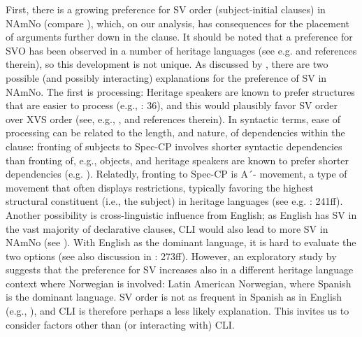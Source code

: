 \documentclass[output=paper]{langscibook}
\begin{document}
First, there is a growing preference for SV order (subject-initial clauses) in NAmNo (compare ), which, on our analysis, has consequences for the placement of arguments further down in the clause. It should be noted that a preference for SVO has been observed in a number of heritage languages (see e.g. \citealt{Laleko2021} and references therein), so this development is not unique. As discussed by \citet{LarssonForthcoming}, there are two possible (and possibly interacting) explanations for the preference of SV in NAmNo. The first is processing: Heritage speakers are known to prefer structures that are easier to process (e.g., \citealt{Polinsky2018}: 36), and this would plausibly favor SV order over XVS order (see, e.g., \citealt{BickelEtAl2015, Hörberg2016}, and references therein). In syntactic terms, ease of processing can be related to the length, and nature, of dependencies within the clause: fronting of subjects to Spec-CP involves shorter syntactic dependencies than fronting of, e.g., objects, and heritage speakers are known to prefer shorter dependencies (e.g. \citealt{BenmamounEtAl2013, HoppEtAl2019}). Relatedly, fronting to Spec-CP is A´- movement, a type of movement that often displays restrictions, typically favoring the highest structural constituent (i.e., the subject) in heritage languages (see e.g. \citealt{Polinsky2018}: 241ff). Another possibility is cross-linguistic influence from English; as English has SV in the vast majority of declarative clauses, CLI would also lead to more SV in NAmNo (see \citealt{WestergaardEtAl2021}). With English as the dominant language, it is hard to evaluate the two options (see also discussion in \citealt{Polinsky2018}: 273ff). However, an exploratory study by \citet{Melvær2023} suggests that the preference for SV increases also in a different heritage language context where Norwegian is involved: Latin American Norwegian, where Spanish is the dominant language. SV order is not as frequent in Spanish as in English (e.g., \citealt{Zagona2002, Arús2010, Lavid2010}), and CLI is therefore perhaps a less likely explanation. This invites us to consider factors other than (or interacting with) CLI. 
\end{document}

